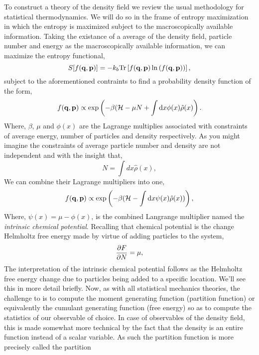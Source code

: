 To construct a theory of the density field we review the usual methodology for
statistical thermodynamics. We will do so in the frame of entropy maximization
in which the entropy is maximized subject to the macroscopically available
information. Taking the existance of a average of the density field, particle
number and energy as the macroscopically available information, we can maximize
the entropy functional, \begin{equation} S[f(\mathbf{q}, \mathbf{p})] = -k_b \mathrm{Tr}\left[ f(\mathbf{q},
\mathbf{p})\ln\left(f(\mathbf{q}, \mathbf{p})\right) \right], \end{equation}
%
subject to the aforementioned contraints to find a probability density function
of the form,
%
\begin{equation} 
    f(\mathbf{q}, \mathbf{p}) \propto \exp\left(-\beta(\mathcal{H} -\mu N + \int \mathrm{d}x
        \phi(x)\hat{\rho}(x)\right).
\end{equation}
%
Where, $\beta$, $\mu$ and $\phi(x)$ are the Lagrange multiplies associated with
constraints of average energy, number of particles and density respectively. As
you might imagine the constraints of average particle number and density are
not independent and with the insight that,
%
\begin{equation} N = \int dx \hat{\rho}(x), \end{equation}
%
We can combine their Lagrange multipliers into one,
%
\begin{equation} f(\mathbf{q}, \mathbf{p}) \propto \exp\left(- \beta(\mathcal{H} - \int \mathrm{d}x
\psi(x) \hat{\rho}(x))\right), \end{equation}
%
Where, $\psi(x) = \mu - \phi(x)$, is the combined Langrange multiplier named
the \textit{intrinsic chemical potential}. Recalling that chemical potential is
the change Helmholtz free energy made by virtue of adding particles to the
system,
%
\begin{equation} \frac{\partial F}{\partial N} = \mu, \end{equation}
%
The interpretation of the intrinsic chemical potential follows as the Helmholtz
free energy change due to particles being added to a specific location.  We'll
see this in more detail briefly.  Now, as with all statistical mechanics
theories, the challenge to is to compute the moment generating function
(partition function) or equivalently the cumulant generating function (free
energy) so as to compute the statistics of our observable of choice.  In case
of observables of the density field, this is made somewhat more technical by
the fact that the density is an entire function instead of a scalar variable.
As such the partition function is more precisely called the partition
